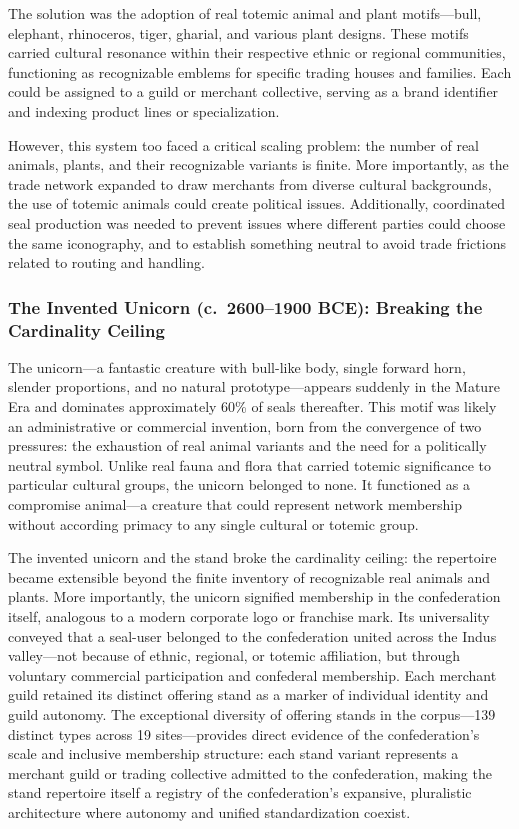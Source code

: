 \documentclass[12pt]{article}
\begin{document}
The solution was the adoption of real totemic animal and plant motifs---bull,
elephant, rhinoceros, tiger, gharial, and various plant designs. These motifs
carried cultural resonance within their respective ethnic or regional communities,
functioning as recognizable emblems for specific trading houses and families. Each could
be assigned to a guild or merchant collective, serving as a brand identifier and
indexing product lines or specialization.

However, this system too faced a critical scaling problem: the number of real
animals, plants, and their recognizable variants is finite. More importantly,
as the trade network expanded to draw merchants from diverse cultural backgrounds,
the use of totemic animals could create political issues. Additionally,
coordinated seal production was needed to prevent issues where different parties
could choose the same iconography, and to establish something neutral to avoid trade
frictions related to routing and handling.

\subsubsection{The Invented Unicorn (c.\ 2600--1900 BCE): Breaking the Cardinality Ceiling}

The unicorn---a fantastic creature with bull-like body, single forward horn, slender
proportions, and no natural prototype---appears suddenly in the Mature Era and dominates
approximately 60\% of seals thereafter. This motif was likely an administrative or
commercial invention, born from the convergence of two pressures: the exhaustion of real
animal variants and the need for a politically neutral symbol. Unlike real fauna and flora
that carried totemic significance to particular cultural groups, the unicorn belonged to
none. It functioned as a compromise animal---a creature that could represent network
membership without according primacy to any single cultural or totemic group.

The invented unicorn and the stand broke the cardinality ceiling: the repertoire
became extensible beyond the finite inventory of recognizable real animals and
plants. More importantly, the unicorn signified membership in the confederation itself,
analogous to a modern corporate logo or franchise mark. Its universality conveyed that 
a seal-user belonged to the confederation united across the Indus valley—not because of 
ethnic, regional, or totemic affiliation, but through voluntary commercial participation 
and confederal membership. Each merchant guild retained its distinct offering stand as a 
marker of individual identity and guild autonomy. The exceptional diversity of offering 
stands in the corpus---139 distinct types across 19 sites---provides direct evidence of 
the confederation's scale and inclusive membership structure: each stand variant 
represents a merchant guild or trading collective admitted to the confederation, making 
the stand repertoire itself a registry of the confederation's expansive, pluralistic 
architecture where autonomy and unified standardization coexist.
\end{document}

